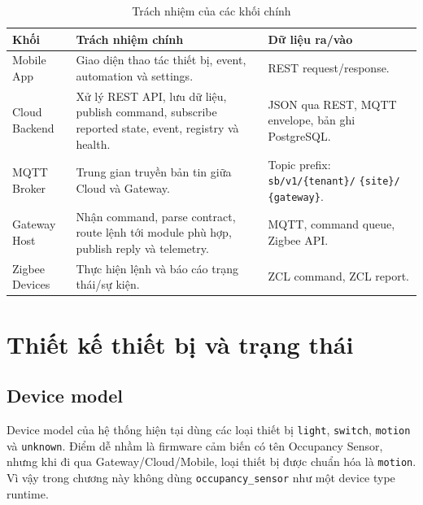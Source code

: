 \begin{table}[H]
    \centering
    \caption{Trách nhiệm của các khối chính}
    \label{tab:ch3-component-responsibility}
    \footnotesize
    \setlength{\tabcolsep}{3pt}
    \begin{tabular}{|>{\raggedright\arraybackslash}p{3.4cm}|>{\raggedright\arraybackslash}p{7.0cm}|>{\raggedright\arraybackslash}p{3.6cm}|}
        \hline
        \textbf{Khối} & \textbf{Trách nhiệm chính} & \textbf{Dữ liệu ra/vào} \\
        \hline
        Mobile App & Giao diện thao tác thiết bị, event, automation và settings. & REST request/response. \\
        \hline
        Cloud Backend & Xử lý REST API, lưu dữ liệu, publish command, subscribe reported state, event, registry và health. & JSON qua REST, MQTT envelope, bản ghi PostgreSQL. \\
        \hline
        MQTT Broker & Trung gian truyền bản tin giữa Cloud và Gateway. & Topic prefix: \newline \texttt{sb/v1/\{tenant\}/} \newline \texttt{\{site\}/} \newline \texttt{\{gateway\}}. \\
        \hline
        Gateway Host & Nhận command, parse contract, route lệnh tới module phù hợp, publish reply và telemetry. & MQTT, command queue, Zigbee API. \\
        \hline
        Zigbee Devices & Thực hiện lệnh và báo cáo trạng thái/sự kiện. & ZCL command, ZCL report. \\
        \hline
    \end{tabular}
    \setlength{\tabcolsep}{6pt}
\end{table}

\section{Thiết kế thiết bị và trạng thái}
\label{sec:ch3-device-state-design}

\subsection{Device model}
\label{sec:ch3-device-model}

Device model của hệ thống hiện tại dùng các loại thiết bị \texttt{light}, \texttt{switch}, \texttt{motion} và \texttt{unknown}. Điểm dễ nhầm là firmware cảm biến có tên Occupancy Sensor, nhưng khi đi qua Gateway/Cloud/Mobile, loại thiết bị được chuẩn hóa là \texttt{motion}. Vì vậy trong chương này không dùng \texttt{occupancy\_sensor} như một device type runtime.

